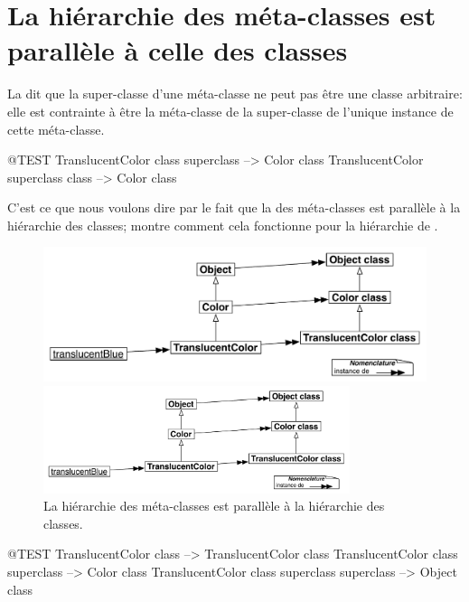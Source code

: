 \documentclass[a4paper,10pt,twoside]{book}
\begin{document}
\section{La hiérarchie des méta-classes est parallèle à celle des classes}

La  dit que la super-classe d'une méta-classe ne peut pas être une classe arbitraire: elle est contrainte à être la méta-classe de la super-classe de l'unique instance de cette méta-classe.
\begin{code}{@TEST}
TranslucentColor class superclass --> Color class
TranslucentColor superclass class --> Color class
\end{code}

\noindent
C'est ce que nous voulons dire par le fait que la  des méta-classes est parallèle à la hiérarchie des classes;  montre comment cela fonctionne pour la hiérarchie de .
 
\begin{center}
\begin{figure}[!ht]
\ifluluelse
	{\centerline {\includegraphics[width=\textwidth]{TranslucentMetaclassHierarchy}}}
	{\centerline {\includegraphics[width=0.8\textwidth]{TranslucentMetaclassHierarchy}}}
\caption{La hiérarchie des méta-classes est parallèle à la hiérarchie des classes.}
\end{figure}
\end{center}

\begin{code}{@TEST}
TranslucentColor class                                     --> TranslucentColor class
TranslucentColor class superclass                   --> Color class
TranslucentColor class superclass superclass --> Object class
\end{code}
\end{document}
